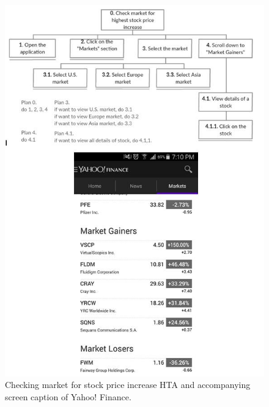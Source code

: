 \documentclass{sigchi}
\begin{document}
\begin{figure}
	\begin{center}
		\includegraphics[width=4.7in]{HTA_SC_2_Yahoo}
	\end{center}
	\caption{Checking market for stock price increase HTA and accompanying screen caption of Yahoo! Finance.}
	\label{fig:figure8}
\end{figure}








%
%
%
%
%
\balance

%
%
\end{document}
